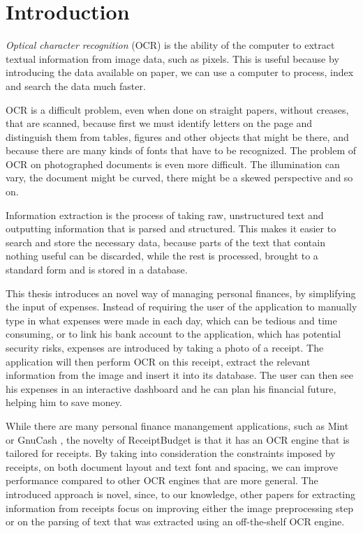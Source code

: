 \chapter{Introduction}
\textit{Optical character recognition} (OCR) is the ability of the computer to extract textual information from image data, such as pixels\cite{schantz1982history}. This is useful because by introducing the data available on paper, we can use a computer to process, index and search the data much faster.  

OCR is a difficult problem, even when done on straight papers, without creases, that are scanned, because first we must identify letters on the page and distinguish them from tables, figures and other objects that might be there, and because there are many kinds of fonts that have to be recognized. The problem of OCR on photographed documents is even more difficult. The illumination can vary, the document might be curved, there might be a skewed perspective and so on. 

Information extraction is the process of taking raw, unstructured text and outputting information that is parsed and structured. This makes it easier to search and store the necessary data, because parts of the text that contain nothing useful can be discarded, while the rest is processed, brought to a standard form and is stored in a database. 

This thesis introduces an novel way of managing personal finances, by simplifying the input of expenses. Instead of requiring the user of the application to manually type in what expenses were made in each day, which can be tedious and time consuming, or to link his bank account to the application, which has potential security risks, expenses are introduced by taking a photo of a receipt. The application will then perform OCR on this receipt, extract the relevant information from the image and insert it into its database. The user can then see his expenses in an interactive dashboard and he can plan his financial future, helping him to save money. 

While there are many personal finance manangement applications, such as Mint\cite{mint} or GnuCash \cite{gnucash}, the novelty of ReceiptBudget is that it has an OCR engine that is tailored for receipts. By taking into consideration the constraints imposed by receipts, on both document layout and text font and spacing, we can improve performance compared to other OCR engines that are more general. The introduced approach is novel, since, to our knowledge, other papers for extracting information from receipts focus on improving either the image preprocessing step or on the parsing of text that was extracted using an off-the-shelf OCR engine.

